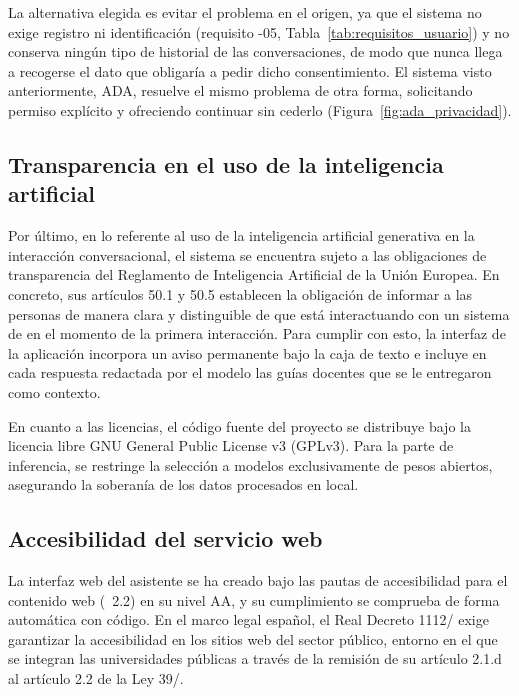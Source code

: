 La alternativa elegida es evitar el problema en el origen, ya que el sistema no exige registro ni identificación (requisito -05, Tabla~\ref{tab:requisitos_usuario}) y no conserva ningún tipo de historial de las conversaciones, de modo que nunca llega a recogerse el dato que obligaría a pedir dicho consentimiento. El sistema visto anteriormente, ADA, resuelve el mismo problema de otra forma, solicitando permiso explícito y ofreciendo continuar sin cederlo (Figura~\ref{fig:ada_privacidad}).

\subsection{Transparencia en el uso de la inteligencia artificial}

Por último, en lo referente al uso de la inteligencia artificial generativa en la interacción conversacional, el sistema se encuentra sujeto a las obligaciones de transparencia del Reglamento de Inteligencia Artificial de la Unión Europea\cite{aiact2024}. En concreto, sus artículos 50.1 y 50.5 establecen la obligación de informar a las personas de manera clara y distinguible de que está interactuando con un sistema de  en el momento de la primera interacción. Para cumplir con esto, la interfaz de la aplicación incorpora un aviso permanente bajo la caja de texto e incluye en cada respuesta redactada por el modelo las guías docentes que se le entregaron como contexto.

En cuanto a las licencias, el código fuente del proyecto se distribuye bajo la licencia libre GNU General Public License v3 (GPLv3)\cite{gpl3}. Para la parte de inferencia, se restringe la selección a modelos exclusivamente de pesos abiertos, asegurando la soberanía de los datos procesados en local.
 
\subsection{Accesibilidad del servicio web}

La interfaz web del asistente se ha creado bajo las pautas de accesibilidad para el contenido web (~2.2)\cite{wcag22} en su nivel AA, y su cumplimiento se comprueba de forma automática con código. En el marco legal español, el Real Decreto 1112/\cite{rd1112_2018} exige garantizar la accesibilidad en los sitios web del sector público, entorno en el que se integran las universidades públicas a través de la remisión de su artículo 2.1.d al artículo 2.2 de la Ley 39/.
